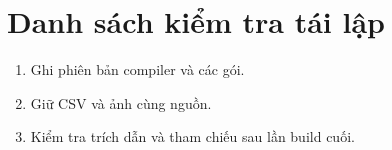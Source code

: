 \chapter{Danh sách kiểm tra tái lập}
\begin{enumerate}
\item Ghi phiên bản compiler và các gói.
\item Giữ CSV và ảnh cùng nguồn.
\item Kiểm tra trích dẫn và tham chiếu sau lần build cuối.
\end{enumerate}

